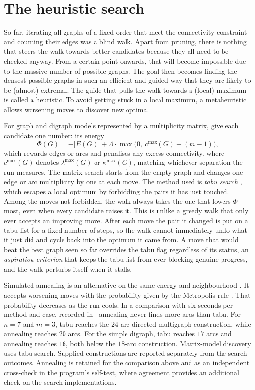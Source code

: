 \section{The heuristic search}
So far, iterating all graphs of a fixed order that meet the connectivity constraint and counting their edges was a blind walk.
Apart from pruning, there is nothing that steers the walk towards better candidates because they all need to be checked anyway.
From a certain point onwards, that will become impossible due to the massive number of possible graphs.
The goal then becomes finding the densest possible graphs in such an efficient and guided way that they are
likely to be (almost) extremal.
The guide that pulls the walk towards a (local) maximum is called a heuristic.
To avoid getting stuck in a local maximum, a metaheuristic allows worsening moves to discover new optima.

For graph and digraph models represented by a multiplicity matrix, give each candidate one number: its energy
\[
    \Phi(G) = -|E(G)| + \Lambda \cdot \max\bigl(0,\ c^{\max}(G) - (m - 1)\bigr),
\]
which rewards edges or arcs and penalises any excess connectivity, where $c^{\max}(G)$ denotes $\lambda^{\max}(G)$ or $\kappa^{\max}(G)$, matching whichever separation the run measures.
The matrix search starts from the empty graph and changes one edge or arc multiplicity by one at each move.
The method used is \emph{tabu search} \cite{Glover89},
which escapes a local optimum by forbidding the pairs it has just touched.
Among the moves not forbidden, the walk always takes the one that lowers $\Phi$ most, even when every candidate raises it.
This is unlike a greedy walk that only ever accepts an improving move.
After each move the pair it changed is put on a tabu list for a fixed number of steps,
so the walk cannot immediately undo what it just did and cycle back into the optimum it came from.
A move that would beat the best graph seen so far overrides the tabu flag regardless of its status,
an \emph{aspiration criterion} that keeps the tabu list from ever blocking genuine progress,
and the walk perturbs itself when it stalls.

Simulated annealing is an alternative on the same energy and neighbourhood \cite{KirkpatrickGelattVecchi83}.
It accepts worsening moves with the probability given by the Metropolis rule \cite{Metropolis53}.
That probability decreases as the run cools.
In a comparison with six seconds per method and case, recorded in , annealing never finds more arcs than tabu.
For $n=7$ and $m=3$, tabu reaches the $24$-arc directed multigraph construction, while annealing reaches $20$ arcs.
For the simple digraph, tabu reaches $17$ arcs and annealing reaches $16$, both below the $18$-arc construction.
Matrix-model discovery uses tabu search. Supplied constructions are reported separately from the search outcomes.
Annealing is retained for the comparison above and as an independent cross-check in the program's self-test,
where agreement provides an additional check on the search implementations.

